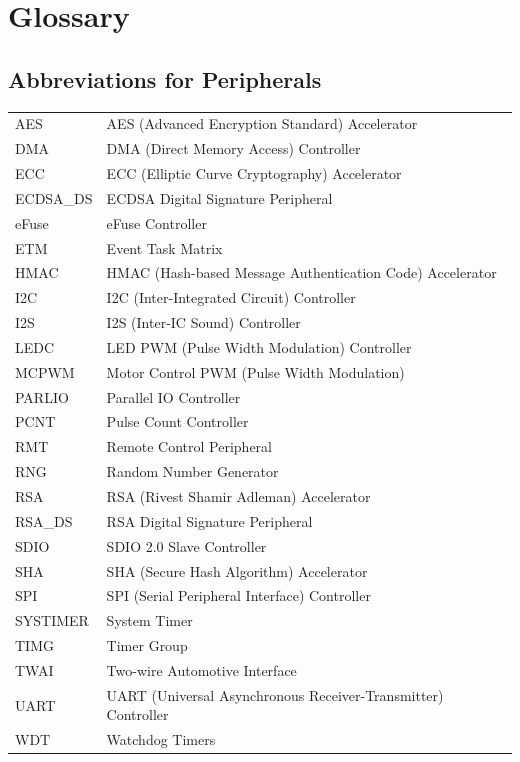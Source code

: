 \section*{Glossary}\label{glossary}
\rhead{\Navigation}

\subsection*{Abbreviations for Peripherals}

\begin{longtable}[c]{ R{3cm} p{12cm} }

AES     & AES (Advanced Encryption Standard) Accelerator \\
DMA     & DMA (Direct Memory Access) Controller \\
ECC     & ECC (Elliptic Curve Cryptography) Accelerator  \\
ECDSA\_DS & ECDSA Digital Signature Peripheral \\
eFuse   & eFuse Controller \\
ETM     & Event Task Matrix \\ 
HMAC    & HMAC (Hash-based Message Authentication Code) Accelerator \\
I2C     & I2C (Inter-Integrated Circuit) Controller \\
I2S     & I2S (Inter-IC Sound) Controller \\
LEDC    & LED PWM (Pulse Width Modulation) Controller \\
MCPWM   & Motor Control PWM (Pulse Width Modulation) \\
PARLIO  & Parallel IO Controller \\ %
PCNT    & Pulse Count Controller \\
RMT     & Remote Control Peripheral \\
RNG     & Random Number Generator \\
RSA     & RSA (Rivest Shamir Adleman) Accelerator \\
RSA\_DS & RSA Digital Signature Peripheral \\
SDIO    & SDIO 2.0 Slave Controller \\ %
SHA     & SHA (Secure Hash Algorithm) Accelerator \\
SPI     & SPI (Serial Peripheral Interface) Controller \\
SYSTIMER & System Timer \\
TIMG    & Timer Group \\
TWAI    & Two-wire Automotive Interface \\
UART    & UART (Universal Asynchronous Receiver-Transmitter) Controller \\
WDT & Watchdog Timers \\

\end{longtable}





